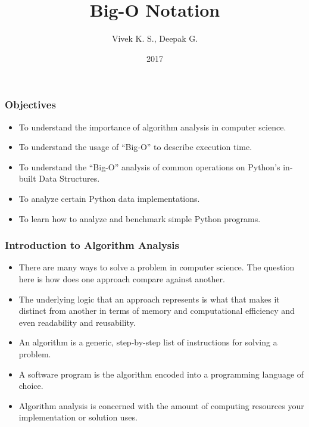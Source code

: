 \documentclass{beamer}
\title{Big-O Notation}
\author{Vivek K. S., Deepak G.}
\institute{Information Systems Decision Sciences (ISDS)\\
MUMA College of Business\\
University of South Florida \\
Tampa, Florida}
\date{2017}
\begin{document}
 
\frame{\titlepage}
 
\begin{frame}
\frametitle{Objectives}
\begin{itemize}
\item To understand the importance of algorithm analysis in computer science.
\item To understand the usage of “Big-O” to describe execution time.
\item To understand the “Big-O” analysis of common operations on Python's in-built Data Structures.
\item To analyze certain Python data implementations.
\item To learn how to analyze and benchmark simple Python programs.

\end{itemize}
\end{frame}

\begin{frame}
\frametitle{Introduction to Algorithm Analysis}
\begin{itemize}
\item There are many ways to solve a problem in computer science. The question here is how does one approach compare against another.
\item The underlying logic that an approach  represents is what that makes it distinct from another in terms of memory and computational efficiency and even readability and reusability.
\item An algorithm is a generic, step-by-step list of instructions for solving a problem.
\item A software program is the algorithm encoded into a programming language of choice. 
\item Algorithm analysis is concerned with the amount of computing resources your implementation or solution uses.
\end{itemize}
\end{frame}
\end{document}
